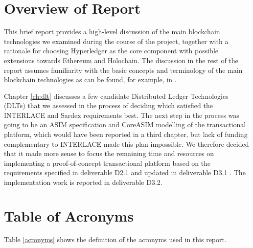 \section{Overview of Report}
This brief report provides a high-level discussion of the main blockchain technologies we examined during the course of the project, together with a rationale for choosing Hyperledger as the core component with possible extensions towards Ethereum and Holochain. The discussion in the rest of the report assumes familiarity with the basic concepts and terminology of the main blockchain technologies as can be found, for example, in \cite{TascaEtAl2017}.

Chapter \ref{ch:dlt} discusses a few candidate Distributed Ledger Technologies (DLTs) that we assessed in the process of deciding which satisfied the INTERLACE and Sardex requirements best. The next step in the process was going to be an ASIM specification and CoreASIM modelling of the transactional platform, which would have been reported in a third chapter, but lack of funding complementary to INTERLACE made this plan impossible. We therefore decided that it made more sense to focus the remaining time and resources on implementing a proof-of-concept transactional platform based on the requirements specified in deliverable D2.1 \cite{INTERLACE_D21} and updated in deliverable D3.1 \cite{INTERLACE_D31}. The implementation work is reported in deliverable D3.2.



\section{Table of Acronyms}
Table \ref{acronyms} shows the definition of the acronyms used in this report.


